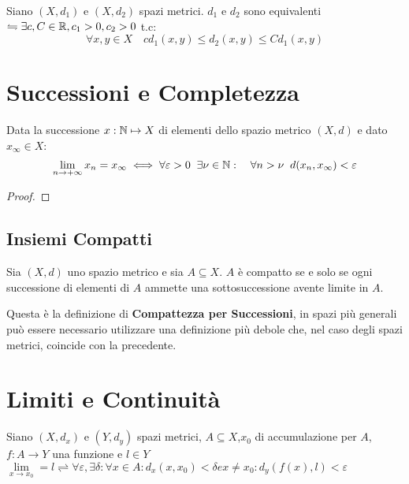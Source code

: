 Siano $(X,d_1)$ e $(X,d_2)$ spazi metrici. $d_1$ e $d_2$ sono equivalenti $\leftrightharpoons \exists c,C\in\mathbb{R}, c_1>0, c_2>0$ t.c:
$$ \forall x,y \in X\quad cd_1(x,y)\le d_2(x,y)\le Cd_1(x,y) $$


\section{Successioni e Completezza}
\begin{definition}
\end{definition}
\begin{definition}
\end{definition}
\begin{definition}
\end{definition}
\begin{proposition}
	\label{prop:succ_conv_lim}
	Data la successione $x: \mathbb{N} \mapsto X$ di elementi dello spazio metrico $(X,d)$ e dato $x_\infty\in X$:
	$$\lim\limits_{n\rightarrow+\infty}x_n=x_\infty\iff\forall\varepsilon > 0\;\;\exists\nu\in\mathbb{N}:\quad\forall n>\nu\;\;d(x_n,x_\infty)<\varepsilon$$
	\begin{proof}
	\end{proof}
\end{proposition}
\subsection{Insiemi Compatti}
\begin{definition}
	\label{def:compatto}
	Sia $(X,d)$ uno spazio metrico e sia $A \subseteq X$. $A$ è compatto se e solo se ogni successione di elementi di $A$ ammette una sottosuccessione avente limite in $A$.
	\begin{note}
		Questa è la definizione di \textbf{Compattezza per Successioni}, in spazi più generali può essere necessario utilizzare una definizione più debole che, nel caso degli spazi metrici, coincide con la precedente.
	\end{note}
\end{definition}

\section{Limiti e Continuità}
\begin{definition}
	Siano $(X,d_x)$ e $(Y,d_y)$ spazi metrici, $A\subseteq{X}$,$x_0$ di accumulazione per $A$, $f:A\rightarrow{Y}$ una funzione e $l\in{Y}$ \\
	$\lim\limits_{x \rightarrow x_0} = l \rightleftharpoons \forall{\varepsilon},\exists\delta : \forall{x}\in A : d_x(x,x_0)<\delta e x\ne{x_0} : d_y(f(x),l)<\varepsilon$
\end{definition}

